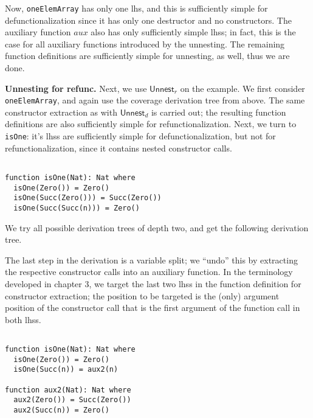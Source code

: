 Now, \texttt{oneElemArray} has only one lhs, and this is sufficiently simple for defunctionalization since it has only one destructor and no constructors. The auxiliary function $aux$ also has only sufficiently simple lhss; in fact, this is the case for all auxiliary functions introduced by the unnesting. The remaining function definitions are sufficiently simple for unnesting, as well, thus we are done.

\textbf{Unnesting for refunc.} Next, we use $\textsf{Unnest}_r$ on the example. We first consider \texttt{oneElemArray}, and again use the coverage derivation tree from above. The same constructor extraction as with $\textsf{Unnest}_d$ is carried out; the resulting function definitions are also sufficiently simple for refunctionalization. Next, we turn to \texttt{isOne}: it's lhss are sufficiently simple for defunctionalization, but not for refunctionalization, since it contains nested constructor calls.

\begin{lstlisting}

function isOne(Nat): Nat where
  isOne(Zero()) = Zero()
  isOne(Succ(Zero())) = Succ(Zero())
  isOne(Succ(Succ(n))) = Zero()

\end{lstlisting}

We try all possible derivation trees of depth two, and get the following derivation tree.

\begin{prooftree}
\end{prooftree}

The last step in the derivation is a variable split; we ``undo'' this by extracting the respective constructor calls into an auxiliary function. In the terminology developed in chapter 3, we target the last two lhss in the function definition for constructor extraction; the position to be targeted is the (only) argument position of the constructor call that is the first argument of the function call in both lhss.

\begin{lstlisting}

function isOne(Nat): Nat where
  isOne(Zero()) = Zero()
  isOne(Succ(n)) = aux2(n)

function aux2(Nat): Nat where
  aux2(Zero()) = Succ(Zero())
  aux2(Succ(n)) = Zero()

\end{lstlisting}

